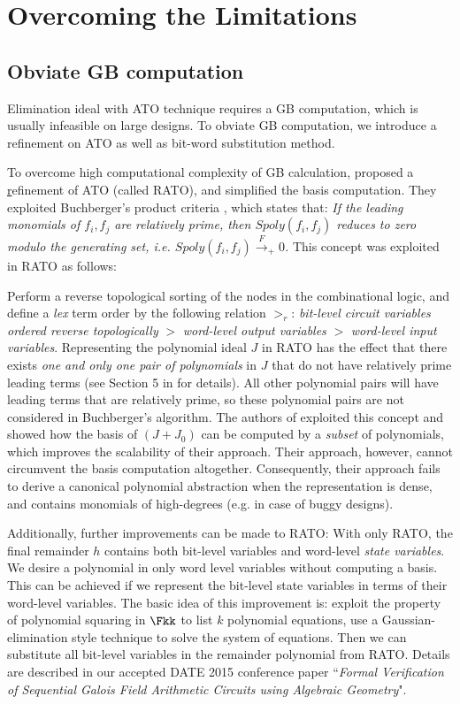 \section{Overcoming the Limitations}
\subsection{Obviate GB computation}
Elimination ideal with ATO technique requires a GB computation, which is usually infeasible on large designs.
To obviate GB computation, we introduce a refinement on ATO as well as bit-word substitution method.

To overcome high computational complexity of GB calculation, \cite{pruss:dac14} proposed a
\underline{r}efinement of ATO (called RATO), and simplified the
\Grobner basis computation. They exploited Buchberger's product
criteria \cite{productc:1979}, which states that: {\it If the leading  
monomials of $f_i, f_j$ are relatively prime, then $Spoly(f_i, f_j)$
reduces to zero modulo the generating set, i.e. $Spoly(f_i, f_j)
\xrightarrow{F} _+ 0$.} This concept was exploited in RATO as follows: 

Perform a reverse topological sorting of the nodes in the
combinational logic, and define a {\it lex} term order by the
following relation $>_{r}$: {\it bit-level circuit variables ordered
  reverse topologically} $>$  {\it word-level output variables} $>$
{\it word-level input   variables}. Representing the polynomial ideal
$J$ in RATO has the effect that there exists {\it one and only one
  pair of polynomials} in $J$ that do not have relatively prime
leading terms (see  Section 5 in \cite{pruss:dac14} for details). All
other polynomial pairs will have leading terms that are 
relatively prime, so these polynomial pairs are not considered in
Buchberger's algorithm.  The authors of \cite{pruss:dac14} exploited
this concept and showed how the \Grobner basis of $(J + J_0)$ can be
computed by a {\it subset} of polynomials, which  improves the
scalability of their approach. Their approach, however, cannot
circumvent the \Grobner basis computation altogether. Consequently, 
their approach fails to derive a canonical polynomial abstraction when
the representation is dense, and contains monomials of high-degrees
(e.g. in case of buggy designs). 

Additionally, further improvements can be made to RATO:
With only RATO, the final remainder $h$ contains both bit-level variables and
word-level {\it state variables}. We desire
a polynomial in only word 
level variables without computing a
\Grobner basis. This can be achieved if we  represent the
bit-level state variables in terms of their word-level
variables. The basic idea of this improvement is: exploit the property of
polynomial squaring in $\Fkk$ to list $k$ polynomial equations,
use a Gaussian-elimination style technique to solve the system of equations.
Then we can substitute all bit-level variables in the remainder polynomial from RATO.
Details are described in our accepted DATE 2015 conference paper 
``{\it Formal Verification of Sequential Galois Field Arithmetic Circuits using Algebraic Geometry}".

